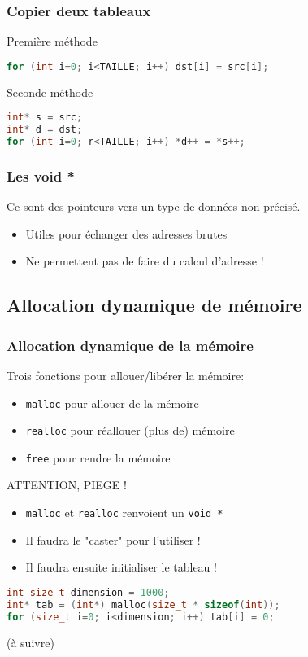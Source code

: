 \documentclass{beamer}
\begin{document}
\begin{frame}[fragile=singleslide,shrink=20]
\frametitle{Copier deux tableaux}
\begin{block}{Première méthode}
\begin{lstlisting}[language=c++]
for (int i=0; i<TAILLE; i++) dst[i] = src[i];
\end{lstlisting}
\end{block}
\begin{block}{Seconde méthode}
\begin{lstlisting}[language=c++]
int* s = src;
int* d = dst;
for (int i=0; r<TAILLE; i++) *d++ = *s++;
\end{lstlisting}
\end{block}

\end{frame}

\begin{frame}[fragile=singleslide,shrink=20]
\frametitle{Les void *}
Ce sont des pointeurs vers un type de données non précisé.
\begin{itemize}
\item{Utiles pour échanger des adresses brutes}
\item{Ne permettent pas de faire du calcul d'adresse !}
\end{itemize}
\end{frame}

\subsection{Allocation dynamique de mémoire}

\begin{frame}[fragile=singleslide,shrink=20]
\frametitle{Allocation dynamique de la mémoire}
Trois fonctions pour allouer/libérer la mémoire:
\begin{itemize}
\item{\texttt{malloc} pour allouer de la mémoire}
\item{\texttt{realloc} pour réallouer (plus de) mémoire}
\item{\texttt{free} pour rendre la mémoire}
\end{itemize}

\begin{block}{ATTENTION, PIEGE !}
\begin{itemize}
\item{\texttt{malloc} et \texttt{realloc} renvoient un \texttt{void *}}
\item{Il faudra le "caster" pour l'utiliser !}
\item{Il faudra ensuite initialiser le tableau !}
\end{itemize}
\begin{lstlisting}[language=c++]
int size_t dimension = 1000;
int* tab = (int*) malloc(size_t * sizeof(int));
for (size_t i=0; i<dimension; i++) tab[i] = 0;
\end{lstlisting}
\end{block}
\end{frame}


\begin{frame}
(à suivre)
\end{frame}
\end{document}
